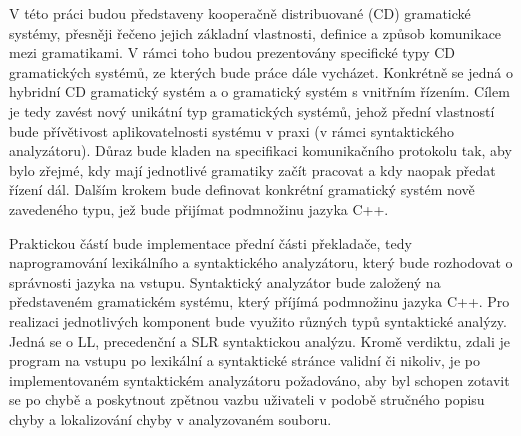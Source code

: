 V této práci budou představeny kooperačně distribuované (CD) gramatické systémy, přesněji řečeno jejich základní vlastnosti, definice a způsob komunikace mezi
gramatikami. V rámci toho budou prezentovány specifické typy CD gramatických systémů, ze kterých bude práce dále vycházet. Konkrétně se jedná o hybridní CD gramatický
systém a o gramatický systém s vnitřním řízením. Cílem je tedy zavést nový unikátní typ gramatických systémů, jehož přední vlastností bude přívětivost aplikovatelnosti
systému v praxi (v rámci syntaktického analyzátoru). Důraz bude kladen na specifikaci komunikačního protokolu tak, aby bylo zřejmé, kdy mají jednotlivé
gramatiky začít pracovat a kdy naopak předat řízení dál. Dalším krokem bude definovat konkrétní gramatický systém nově zavedeného typu, jež bude přijímat podmnožinu
jazyka C++.

Praktickou částí bude implementace přední části překladače, tedy naprogramování lexikálního a syntaktického analyzátoru, který bude rozhodovat o správnosti jazyka na vstupu.
Syntaktický analyzátor bude založený na představeném gramatickém systému, který příjímá podmnožinu jazyka C++. Pro realizaci jednotlivých komponent bude využito
různých typů syntaktické analýzy. Jedná se o LL, precedenční a SLR syntaktickou analýzu. Kromě verdiktu, zdali je program na vstupu po lexikální a syntaktické stránce validní či nikoliv,
je po implementovaném syntaktickém analyzátoru požadováno, aby byl schopen zotavit se po chybě a poskytnout zpětnou vazbu uživateli v podobě stručného popisu chyby a lokalizování
chyby v analyzovaném souboru.



